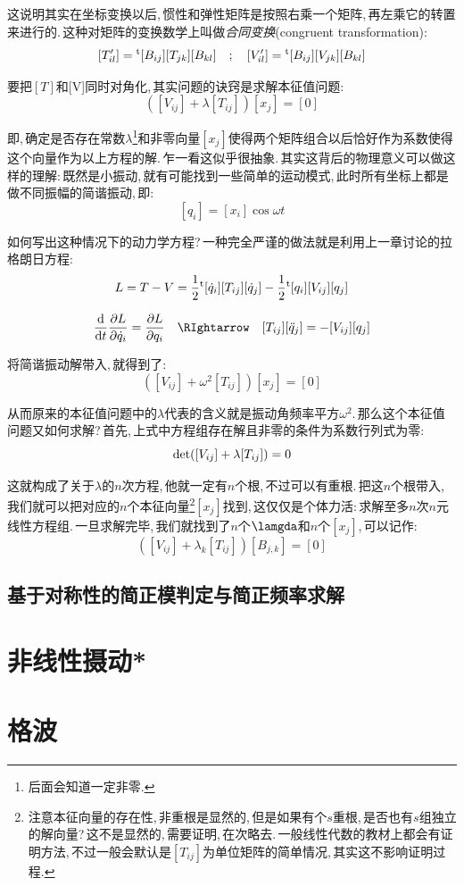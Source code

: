 这说明其实在坐标变换以后,\,惯性和弹性矩阵是按照右乘一个矩阵,\,再左乘它的转置来进行的.\,这种对矩阵的变换数学上叫做\emph{合同变换}(congruent transformation):
\[[T'_{il}]=\phantom{}^{\rm t}[B_{ij}][T_{jk}][B_{kl}]\quad ;\quad [V'_{il}] =\phantom{}^{\rm t}[B_{ij}][V_{jk}][B_{kl}]\]

要把$[T]$和[V]同时对角化,\,其实问题的诀窍是求解本征值问题:
\[([V_{ij}]+\lambda [T_{ij}])[x_j]=[0]\]

即,\,确定是否存在常数$\lambda$\footnote{后面会知道一定非零.}和非零向量$[x_j]$使得两个矩阵组合以后恰好作为系数使得这个向量作为以上方程的解.\,乍一看这似乎很抽象.\,其实这背后的物理意义可以做这样的理解:\,既然是小振动,\,就有可能找到一些简单的运动模式,\,此时所有坐标上都是做不同振幅的简谐振动,\,即:
\[[q_i]=[x_i]\cos\omega t\]




如何写出这种情况下的动力学方程?\,一种完全严谨的做法就是利用上一章讨论的拉格朗日方程:
\[L=T-V=\frac{1}{2}\phantom{}^{\rm t}[\dot{q}_i][T_{ij}][\dot{q}_j]-\frac{1}{2}\phantom{}^{\rm t}[q_i][V_{ij}][q_j]\]

\[\frac{\ud }{\ud t}\frac{\partial L}{\partial \dot{q}_i}=\frac{\partial L}{\partial {q}_i}\quad\RIghtarrow \quad [T_{ij}][\ddot{q}_j]=-[V_{ij}][q_j]\]

将简谐振动解带入,\,就得到了:
\[([V_{ij}]+\omega^2 [T_{ij}])[x_j]=[0]\]

从而原来的本征值问题中的$\lambda$代表的含义就是振动角频率平方$\omega^2$.\,那么这个本征值问题又如何求解?\,首先,\,上式中方程组存在解且非零的条件为系数行列式为零:
\[{\rm det}([V_{ij}]+\lambda [T_{ij}])=0\]

这就构成了关于$\lambda$的$n$次方程,\,他就一定有$n$个根,\,不过可以有重根.\,把这$n$个根带入,\,我们就可以把对应的$n$个本征向量\footnote{注意本征向量的存在性,\,非重根是显然的,\,但是如果有个$s$重根,\,是否也有$s$组独立的解向量?\,这不是显然的,\,需要证明,\,在次略去.\,一般线性代数的教材上都会有证明方法,\,不过一般会默认是$[T_{ij}]$为单位矩阵的简单情况,\,其实这不影响证明过程.}$[x_j]$找到,\,这仅仅是个体力活:\,求解至多$n$次$n$元线性方程组.\,一旦求解完毕,\,我们就找到了$n$个$\lamgda$和$n$个$[x_j]$,\,可以记作:
\[([V_{ij}]+\lambda_k [T_{ij}])[B_{j,k}]=[0]\]

\subsection{基于对称性的简正模判定与简正频率求解}



\section{非线性摄动*}

\section{格波}



